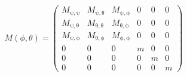 $$
M(\phi,\theta)=\left(\begin{array}{cccccc} M_{\mathrm{\psi},\mathrm{\psi}} & M_{\mathrm{\psi},\mathrm{\theta}} & M_{\mathrm{\psi},\mathrm{\phi}} & 0 & 0 & 0\\ M_{\mathrm{\psi},\mathrm{\theta}} & M_{\mathrm{\theta},\mathrm{\theta}} & M_{\mathrm{\theta},\mathrm{\phi}} & 0 & 0 & 0\\ M_{\mathrm{\psi},\mathrm{\phi}} & M_{\mathrm{\theta},\mathrm{\phi}} & M_{\mathrm{\phi},\mathrm{\phi}} & 0 & 0 & 0\\ 0 & 0 & 0 & m & 0 & 0\\ 0 & 0 & 0 & 0 & m & 0\\ 0 & 0 & 0 & 0 & 0 & m \end{array}\right)
$$
